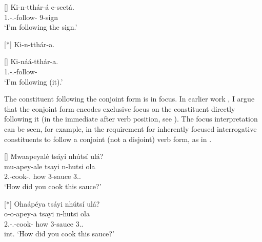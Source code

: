 \documentclass[output=paper]{langscibook}
\begin{document}
\ea
\label{bkm:Ref129072678}
\begin{xlist}
\exi{\CJ}
[]{
\gll
Ki-n-tthár-á  e-seetá.\\
1\SG{}.\SM{}-\PRS{}.\CJ{}-follow-\FV{}  9-sign\\
\glt
‘I’m following the sign.’\\
}

\exi{\CJ}
[*]{
Ki-n-tthár-a. \\
}

\exi{\DJ}
[]{
\gll
Ki-náá-tthár-a.\\
1\SG{}.\SM{}-\PRS{}.\DJ{}-follow-\FV{}\\
\glt
‘I’m following (it).’\\
}

\end{xlist}
\z

The constituent following the conjoint form is in focus. In earlier work \citep{vanderWal2009a,vanderWal2011}, I argue that the conjoint form encodes exclusive focus on the constituent directly following it (in the immediate after verb position, see ). The focus interpretation can be seen, for example, in the requirement for inherently focused interrogative constituents to follow a conjoint (not a disjoint) verb form, as in .

\ea
\label{bkm:Ref95490193}
\begin{xlist}
\exi{\CJ}
[]{
Mwaapeyalé tsáyi nhútsí ulá?\\
\gll
mu-apey-ale  tsayi  n-hutsi  ola\\
2\PL{}.\SM{}-cook-\PFV{}.\CJ{}  how  3-sauce  3.\DEM{}.\PROX{}\\
\glt
‘How did you cook this sauce?’\\
}

\exi{\DJ}
[*]{
Ohaápéya tsáyi nhútsí ulá?\\
\gll
o-o-apey-a  tsayi  n-hutsi  ola\\
2\SG{}.\SM{}-\PFV{}.\DJ{}-cook-\FV{}  how  3-sauce  3.\DEM{}.\PROX{}\\
\glt
int. ‘How did you cook this sauce?’
}

\end{xlist}
\z
\end{document}
